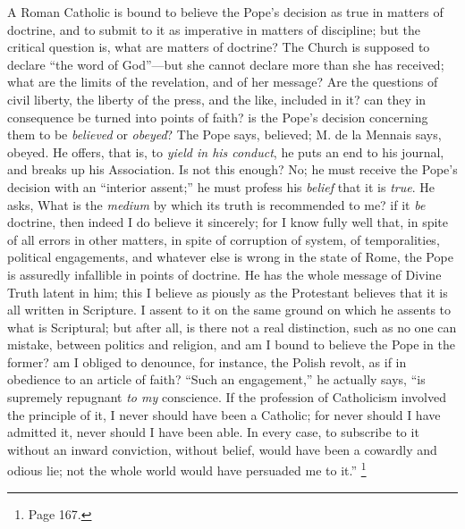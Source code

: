 A Roman Catholic is bound to believe the Pope's
decision as true in matters of doctrine, and to submit to it as
imperative in matters of discipline; but the critical question is,
what are matters of doctrine? The Church is supposed to declare ``the
word of God''—but she cannot declare more than she has received; what
are the limits of the revelation, and of her message? Are the
questions of civil liberty, the liberty of the press, and the like,
included in it? can they in consequence be turned into points of
faith? is the Pope's decision concerning them to be \emph{believed} or
\emph{obeyed}? The Pope says, believed; M. de la Mennais says, obeyed.
He offers, that is, to \emph{yield in his conduct}, he puts an end to
his journal, and breaks up his Association. Is not this enough? No; he
must receive the Pope's decision with an ``interior assent;'' he must
profess his \emph{belief} that it is \emph{true}. He asks, What is the
\emph{medium} by which its truth is recommended to me? if it \emph{be}
doctrine, then indeed I do believe it sincerely; for I know fully well
that, in spite of all errors in other matters, in spite of corruption
of system, of temporalities, political engagements, and whatever else
is wrong in the state of Rome, the Pope is assuredly infallible in
points of doctrine. He has the whole message of Divine Truth latent in
him; this I believe as piously as the Protestant believes that it is
all written in Scripture. I assent to it on the same ground on which
he assents to what is Scriptural; but after all, is there not a real
distinction, such as no one can mistake, between politics and
religion, and am I bound to believe the Pope in the former? am I
obliged to denounce, for instance, the Polish revolt, as if in
obedience to an article of faith? ``Such an engagement,'' he
actually says, ``is supremely repugnant \emph{to my} conscience. If the
profession of Catholicism involved the principle of it, I never should
have been a Catholic; for never should I have admitted it, never
should I have been able. In every case, to subscribe to it without an
inward conviction, without belief, would have been a cowardly and
odious lie; not the whole world would have persuaded me to it.'' \footnote{Page 167.}

